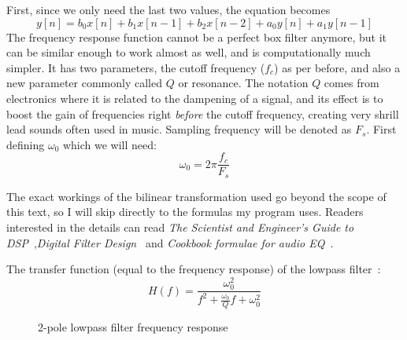 \documentclass[11pt,a4paper]{article}
\begin{document}
First, since we only need the last two values, the equation becomes
\begin{equation}
y[n] = b_0x[n] + b_1x[n-1] + b_2x[n-2] + a_0y[n] + a_1y[n-1]
\end{equation}
The frequency response function cannot be a perfect box filter anymore, but it can be similar enough to work almost as well, and is computationally much simpler.
It has two parameters, the cutoff frequency (\(f_c\)) as per before, and also a new parameter commonly called \(Q\) or resonance. The notation $Q$ comes from electronics where it is related to the dampening of a signal, and its effect is to boost the gain of frequencies right \emph{before} the cutoff frequency, creating very shrill lead sounds often used in music.
Sampling frequency will be denoted as \(F_s\).
First defining $\omega_0$ which we will need:
\begin{equation}
\omega_0 = 2{\pi}\frac{f_c}{F_s}
\end{equation}

The exact workings of the bilinear transformation used go beyond the scope of this text, so I will skip directly to the formulas my program uses. Readers interested in the details can read \emph{The Scientist and Engineer's Guide to DSP}~\cite[chap. 33]{SmithDSP},\emph{Digital Filter Design}~\cite[chap. 3.5]{ZoranDFD} and \emph{Cookbook formulae for audio EQ}~\cite{Cookbook}.

The transfer function (equal to the frequency response) of the lowpass filter~\cite[section 8.2]{LinearCircuit}:
\begin{equation}
H(f) = \frac{\omega_0^2}{f^2 + \frac{\omega_0}{Q}f + \omega_0^2}
\end{equation}



\begin{figure}[ht]
\caption{2-pole lowpass filter frequency response}
\centering
{}

\end{figure}
\end{document}
